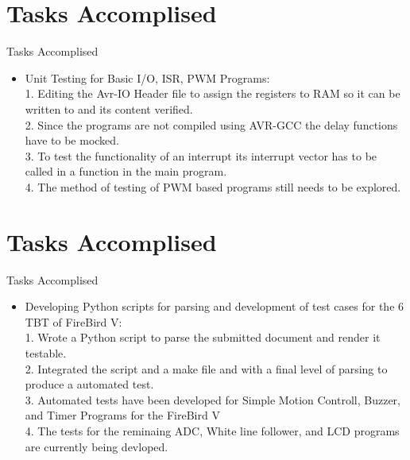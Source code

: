 \documentclass[10pt, a4paper]{beamer}
\begin{document}
\section{Tasks Accomplised}
\begin{frame}{Tasks Accomplised}
	\begin{itemize}
	  \item Unit Testing for Basic I/O, ISR, PWM Programs:\\ 
	  \hspace{.1cm} 1. Editing the Avr-IO Header file to assign the registers to RAM so it can be written to and its content verified. \\
          \hspace{.1cm} 2. Since the programs are not compiled using AVR-GCC the delay functions have to be mocked.\\
	  \hspace{.1cm} 3. To test the functionality of an interrupt its interrupt vector has to be called in a function in the main program. \\
	  \hspace{.1cm} 4. The method of testing of PWM based programs still needs to be explored. \\
	\end{itemize}
\end{frame}

\section{Tasks Accomplised}
\begin{frame}{Tasks Accomplised}
	\begin{itemize}
	  \item Developing Python scripts for parsing and development of test cases for the 6 TBT of FireBird V:\\
	  \hspace{.1cm} 1. Wrote a Python script to parse the submitted document and render it testable. \\
          \hspace{.1cm} 2. Integrated the script and a make file and with a final level of parsing to produce a automated test.\\
	  \hspace{.1cm} 3. Automated tests have been developed for Simple Motion Controll, Buzzer, and Timer Programs for the FireBird V \\
	  \hspace{.1cm} 4. The tests for the reminaing ADC, White line follower, and LCD programs are currently being devloped. \\
	\end{itemize}
\end{frame}
\end{document}
